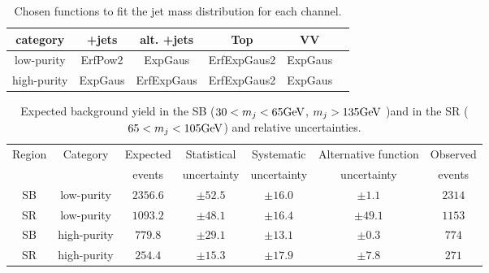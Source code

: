 \begin{table}[!htb]
  \begin{center}
    \begin{tabular}{c|ccccc}
      category & \V+jets & alt. \V+jets & Top & VV \\
      \hline
      \hline
      low-purity  & ErfPow2 & ExpGaus & ErfExpGaus2 & ExpGaus \\
      \hline
      high-purity & ExpGaus & ErfExpGaus & ErfExpGaus2 & ExpGaus \\
    \end{tabular}
  \end{center}
  \caption{Chosen functions to fit the jet mass distribution for each channel.}\label{tab:MassFunctions}
\end{table}

\begin{table}[!htb]
  \begin{center}
    \begin{tabular}{cc|c|ccc|c}
      Region & Category   & Expected & Statistical       & Systematic     & Alternative function& Observed \\
       &  & events & uncertainty       & uncertainty     & uncertainty & events\\
      \hline
      \hline
      SB     & low-purity & $2356.6$ & $\pm 52.5$ & $\pm 16.0$ & $\pm 1.1$    & $2314$ \\
      SR     & low-purity & $1093.2$  & $\pm 48.1$ & $\pm 16.4$ & $\pm 49.1$   & $1153$ \\
      \hline
      SB & high-purity    & $779.8$  & $\pm 29.1$ & $\pm 13.1$ & $\pm 0.3$  & $774$ \\
      SR & high-purity    & $254.4$  & $\pm 15.3$ & $\pm 17.9$ & $\pm 7.8$  & $271$ \\
    \end{tabular}
  \end{center}
  \caption{Expected background yield in the SB ($30 < m_j < 65\text{GeV}$, $m_j > 135\text{GeV}$ )and in the SR ($65 < m_j < 105\text{GeV}$) and relative uncertainties.}\label{tab:BkgNorm}
\end{table}

